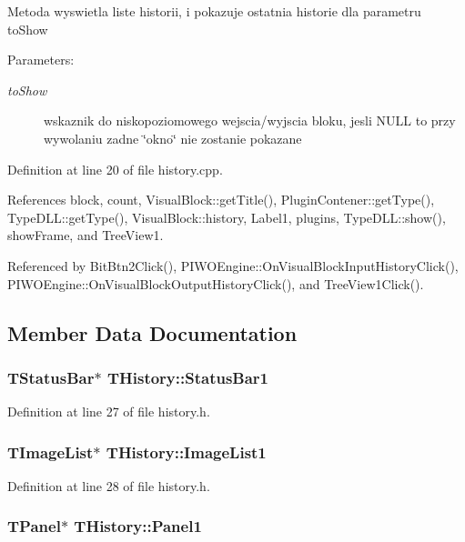 Metoda wyswietla liste historii, i pokazuje ostatnia historie dla parametru toShow \begin{Desc}
\item[Parameters:]
\begin{description}
\item[{\em toShow}]wskaznik do niskopoziomowego wejscia/wyjscia bloku, jesli NULL to przy wywolaniu zadne \char`\"{}okno\char`\"{} nie zostanie pokazane \end{description}
\end{Desc}


Definition at line 20 of file history.cpp.

References block, count, VisualBlock::getTitle(), PluginContener::getType(), TypeDLL::getType(), VisualBlock::history, Label1, plugins, TypeDLL::show(), showFrame, and TreeView1.

Referenced by BitBtn2Click(), PIWOEngine::OnVisualBlockInputHistoryClick(), PIWOEngine::OnVisualBlockOutputHistoryClick(), and TreeView1Click().

\subsection{Member Data Documentation}
\hypertarget{classTHistory_a3f5f2b91a14af33829123e0aaca3928}{
\subsubsection[StatusBar1]{\setlength{\rightskip}{0pt plus 5cm}TStatusBar$\ast$ {\bf THistory::StatusBar1}}}
\label{classTHistory_a3f5f2b91a14af33829123e0aaca3928}




Definition at line 27 of file history.h.\hypertarget{classTHistory_d1855973aa68d9e9cca14f5632ddfae8}{
\subsubsection[ImageList1]{\setlength{\rightskip}{0pt plus 5cm}TImageList$\ast$ {\bf THistory::ImageList1}}}
\label{classTHistory_d1855973aa68d9e9cca14f5632ddfae8}




Definition at line 28 of file history.h.\hypertarget{classTHistory_4b99f5e227a8e165e6d64be62227c458}{
\subsubsection[Panel1]{\setlength{\rightskip}{0pt plus 5cm}TPanel$\ast$ {\bf THistory::Panel1}}}
\label{classTHistory_4b99f5e227a8e165e6d64be62227c458}





